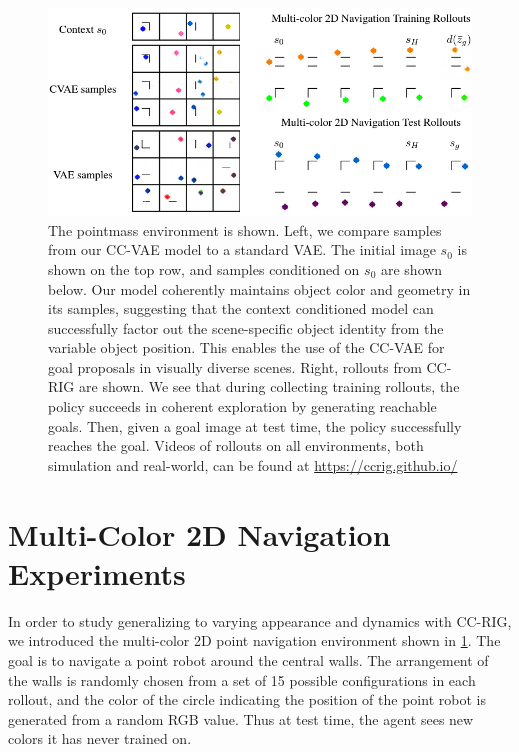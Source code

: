 
\begin{figure}[b]
    \centering
   \includegraphics[width=\textwidth]{ccrig/img/cvae_samples/w_pmass1_cvae_samples.PNG}
    \caption{The pointmass environment is shown. Left, we compare samples from our CC-VAE model to a standard VAE. The initial image $s_0$ is shown on the top row, and samples conditioned on $s_0$ are shown below. Our model coherently maintains object color and geometry in its samples, suggesting that the context conditioned model can successfully factor out the scene-specific object identity from the variable object position. This enables the use of the CC-VAE for goal proposals in visually diverse scenes. Right, rollouts from CC-RIG are shown. We see that during collecting training rollouts, the policy succeeds in coherent exploration by generating reachable goals. Then, given a goal image at test time, the policy successfully reaches the goal. 
    Videos of rollouts on all environments, both simulation and real-world, can be found at  \url{https://ccrig.github.io/}
    }
    \label{fig:pointmass}
\end{figure}

\section{Multi-Color 2D Navigation Experiments} \label{sec:pointmass}

In order to study generalizing to varying appearance and dynamics with CC-RIG, we introduced the multi-color 2D point navigation environment shown in \ref{fig:pointmass}. The goal is to navigate a point robot around the central walls. The arrangement of the walls is randomly chosen from a set of 15 possible configurations in each rollout, and the color of the circle indicating the position of the point robot is generated from a random RGB value. Thus at test time, the agent sees new colors it has never trained on.

